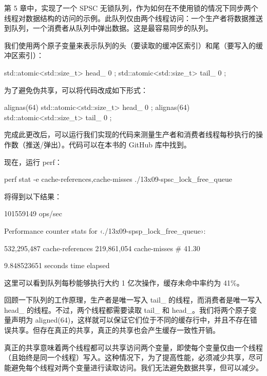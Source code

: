 第 5 章中，实现了一个 SPSC 无锁队列，作为如何在不使用锁的情况下同步两个线程对数据结构的访问的示例。此队列仅由两个线程访问：一个生产者将数据推送到队列，一个消费者从队列中弹出数据。这是最容易同步的队列。

我们使用两个原子变量来表示队列的头（要读取的缓冲区索引）和尾（要写入的缓冲区索引）：

\begin{cpp}
std::atomic<std::size_t> head_ { 0 };
std::atomic<std::size_t> tail_ { 0 };
\end{cpp}

为了避免伪共享，可以将代码改成如下形式：

\begin{cpp}
alignas(64) std::atomic<std::size_t> head_ { 0 };
alignas(64) std::atomic<std::size_t> tail_ { 0 };
\end{cpp}

完成此更改后，可以运行我们实现的代码来测量生产者和消费者线程每秒执行的操作数（推送/弹出）。代码可以在本书的 GitHub 库中找到。

现在，运行 perf：

\begin{shell}
perf stat -e cache-references,cache-misses ./13x09-spsc_lock_free_queue
\end{shell}

将得到以下结果：

\begin{shell}
101559149 ops/sec

    Performance counter stats for ‹./13x09-spsp_lock_free_queue›:

        532,295,487      cache-references
        219,861,054      cache-misses # 41.30%

        9.848523651 seconds time elapsed
\end{shell}

这里可以看到队列每秒能够执行大约 1 亿次操作，缓存未命中率约为 41\%。

回顾一下队列的工作原理，生产者是唯一写入 tail\_ 的线程，而消费者是唯一写入 head\_ 的线程。不过，两个线程都需要读取 tail\_ 和 head\_。我们将两个原子变量声明为 aligned(64)，这样就可以保证它们位于不同的缓存行中，并且不存在错误共享。但存在真正的共享，真正的共享也会产生缓存一致性开销。

真正的共享意味着两个线程都可以共享访问两个变量，即使每个变量仅由一个线程（且始终是同一个线程）写入。这种情况下，为了提高性能，必须减少共享，尽可能避免每个线程对两个变量进行读取访问。我们无法避免数据共享，但可以减少。

